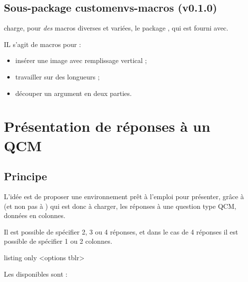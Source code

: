 \documentclass[french,11pt,a4paper]{article}
\begin{document}
\subsection{Sous-package customenvs-macros (v0.1.0)}

 charge, pour \textit{des} macros diverses et variées, le package , qui est fourni avec.

\smallskip

IL s'agit de macros pour :

\begin{itemize}
	\item insérer une image avec remplissage vertical ;
	\item travailler sur des longueurs ;
	\item découper un argument en deux parties.
\end{itemize}

\newpage

\section{Présentation de réponses à un QCM}

\subsection{Principe}

L'idée est de proposer une environnement prêt à l'emploi pour présenter, grâce à  (et non pas à ) qui est donc à charger, les réponses à une question type QCM, données en colonnes.

\smallskip

Il est possible de spécifier 2, 3 ou 4 réponses, et dans le cas de 4 réponses il est possible de spécifier 1 ou 2 colonnes.

\begin{DemoCode}{listing only}
<options tblr>
\end{DemoCode}

Les  disponibles sont :
\end{document}
